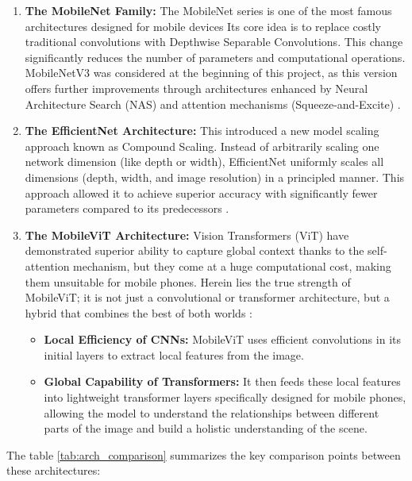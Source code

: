 \begin{enumerate}
    \item \textbf{The MobileNet Family:} The MobileNet series is one of the most famous architectures designed for mobile devices Its core idea is to replace costly traditional convolutions with Depthwise Separable Convolutions. This change significantly reduces the number of parameters and computational operations. MobileNetV3 was considered at the beginning of this project, as this version offers further improvements through architectures enhanced by Neural Architecture Search (NAS) and attention mechanisms (Squeeze-and-Excite) \cite{koonce2021mobilenetv3}.
    \item \textbf{The EfficientNet Architecture:} This introduced a new model scaling approach known as Compound Scaling. Instead of arbitrarily scaling one network dimension (like depth or width), EfficientNet uniformly scales all dimensions (depth, width, and image resolution) in a principled manner. This approach allowed it to achieve superior accuracy with significantly fewer parameters compared to its predecessors \cite{koonce2021efficientnet}.
    \item \textbf{The MobileViT Architecture:} Vision Transformers (ViT) have demonstrated superior ability to capture global context thanks to the self-attention mechanism, but they come at a huge computational cost, making them unsuitable for mobile phones. Herein lies the true strength of MobileViT; it is not just a convolutional or transformer architecture, but a hybrid that combines the best of both worlds \cite{mehta2021mobilevit}:
    \begin{itemize}
        \item \textbf{Local Efficiency of CNNs:} MobileViT uses efficient convolutions in its initial layers to extract local features from the image.
        \item \textbf{Global Capability of Transformers:} It then feeds these local features into lightweight transformer layers specifically designed for mobile phones, allowing the model to understand the relationships between different parts of the image and build a holistic understanding of the scene.
    \end{itemize}
\end{enumerate}

The table \ref{tab:arch_comparison} summarizes the key comparison points between these architectures:

